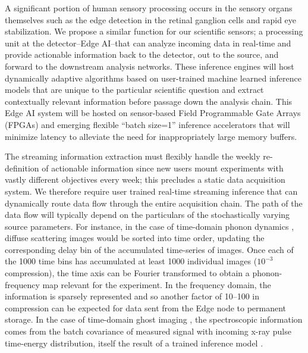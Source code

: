 \documentclass{article}
\begin{document}
A significant portion of human sensory processing occurs in the sensory organs themselves such as the edge detection in the retinal ganglion cells and rapid eye stabilization.
We propose a similar function for our scientific sensors; a processing unit at the detector--Edge AI--that can analyze incoming data in real-time and provide actionable information back to the detector, out to the source, and forward to the downstream analysis networks.
These inference engines will host dynamically adaptive algorithms based on user-trained machine learned inference models that are unique to the particular scientific question and extract contextually relevant information before passage down the analysis chain.
This Edge AI system will be hosted on sensor-based Field Programmable Gate Arrays (FPGAs) and emerging flexible ``batch size=1'' inference accelerators \cite{edgetpu_benchmarks,edgetpu,waveCGRA,CGRAreview,seaofcores} that will minimize latency to alleviate the need for inappropriately large memory buffers.

The streaming information extraction must flexibly handle the weekly re-definition of actionable information since new users mount experiments with vastly different objectives every week; this precludes a static data acquisition system. 
We therefore require user trained real-time streaming inference that can dynamically route data flow through the entire acquisition chain.
The path of the data flow will typically depend on the particulars of the stochastically varying source parameters.
For instance, in the case of time-domain phonon dynamics \cite{Mariano2013}, diffuse scattering images would be sorted into time order, updating the corresponding delay bin of the accumulated time-series of images.
Once each of the 1000 time bins has accumulated at least 1000 individual images ($10^{-3}$ compression), the time axis can be Fourier transformed to obtain a phonon-frequency map relevant for the experiment.
In the frequency domain, the information is sparsely represented and so another factor of 10--100 in compression can be expected for data sent from the Edge node to permanent storage.
In the case of time-domain ghost imaging \cite{Taran2020}, the spectroscopic information comes from the batch covariance of measured signal with incoming x-ray pulse time-energy distribution, itself the result of a trained inference model \cite{Audrey}.
\end{document}
